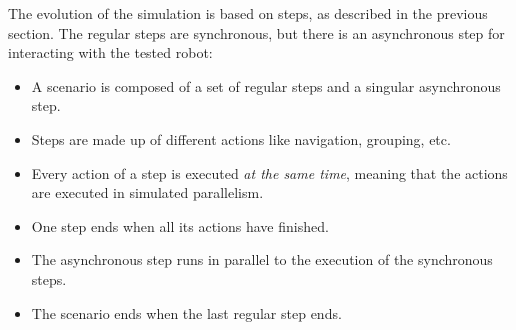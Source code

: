 The evolution of the simulation is based on steps, as described in the previous section. The regular steps are synchronous, but there is an asynchronous step for interacting with the tested robot:
\begin{itemize}
    \item A scenario is composed of a set of regular steps and a singular asynchronous step.  
    \item Steps are made up of different actions like navigation, grouping, etc.
    \item Every action of a step is executed {\em at the same time}, meaning that the actions are executed in simulated parallelism. 
    \item One step ends when all its actions have finished.
    \item The asynchronous step runs in parallel to the execution of the synchronous steps. 
    \item The scenario ends when the last regular step ends.
\end{itemize}

